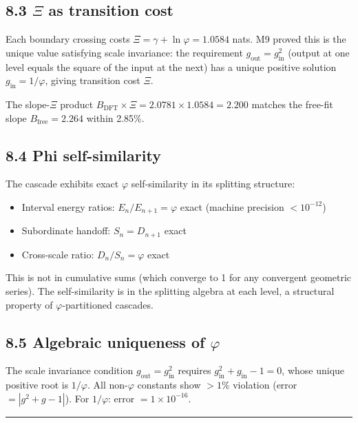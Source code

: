\documentclass[11pt,a4paper]{article}
\providecommand{\tightlist}{\setlength{\itemsep}{0pt}\setlength{\parskip}{0pt}}
\begin{document}
\subsection*{8.3 $\Xi$ as transition cost}

Each boundary crossing costs $\Xi = \gamma + \ln\varphi = 1.0584$ nats. M9 proved this is the unique value satisfying scale invariance: the requirement $g_{\text{out}} = g_{\text{in}}^2$ (output at one level equals the square of the input at the next) has a unique positive solution $g_{\text{in}} = 1/\varphi$, giving transition cost $\Xi$.

The slope-$\Xi$ product $B_{\text{DFT}} \times \Xi = 2.0781 \times 1.0584 = 2.200$ matches the free-fit slope $B_{\text{free}} = 2.264$ within 2.85\%.

\subsection*{8.4 Phi self-similarity}

The cascade exhibits exact $\varphi$ self-similarity in its splitting structure:
\begin{itemize}\tightlist
\item Interval energy ratios: $E_n / E_{n+1} = \varphi$ exact (machine precision $< 10^{-12}$)
\item Subordinate handoff: $S_n = D_{n+1}$ exact
\item Cross-scale ratio: $D_n / S_n = \varphi$ exact
\end{itemize}

This is not in cumulative sums (which converge to 1 for any convergent geometric series). The self-similarity is in the splitting algebra at each level, a structural property of $\varphi$-partitioned cascades.

\subsection*{8.5 Algebraic uniqueness of $\varphi$}

The scale invariance condition $g_{\text{out}} = g_{\text{in}}^2$ requires $g_{\text{in}}^2 + g_{\text{in}} - 1 = 0$, whose unique positive root is $1/\varphi$. All non-$\varphi$ constants show $> 1\%$ violation (error $= |g^2 + g - 1|$). For $1/\varphi$: error $= 1 \times 10^{-16}$.

\begin{center}\rule{0.5\linewidth}{0.4pt}\end{center}
\end{document}
